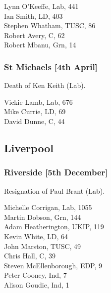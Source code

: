 \documentclass[a4paper,openany,10pt]{book}
\begin{document}
Lynn O'Keeffe, Lab, 441\\
Ian Smith, LD, 403\\
Stephen Whatham, TUSC, 86\\
Robert Avery, C, 62\\
Robert Mbanu, Grn, 14\\


\subsubsection*{St Michaels \hspace*{\fill}\nolinebreak[1]%
\enspace\hspace*{\fill}
[4th April]}


Death of Ken Keith (Lab).



Vickie Lamb, Lab, 676\\
Mike Currie, LD, 69\\
David Dunne, C, 44\\


\subsection*{Liverpool}

\subsubsection*{Riverside \hspace*{\fill}\nolinebreak[1]%
\enspace\hspace*{\fill}
[5th December]}


Resignation of Paul Brant (Lab).



Michelle Corrigan, Lab, 1055\\
Martin Dobson, Grn, 144\\
Adam Heatherington, UKIP, 119\\
Kevin White, LD, 64\\
John Marston, TUSC, 49\\
Chris Hall, C, 39\\
{Steven McEllenborough}, EDP, 9\\
Peter Cooney, Ind, 7\\
Alison Goudie, Ind, 1\\
\end{document}
